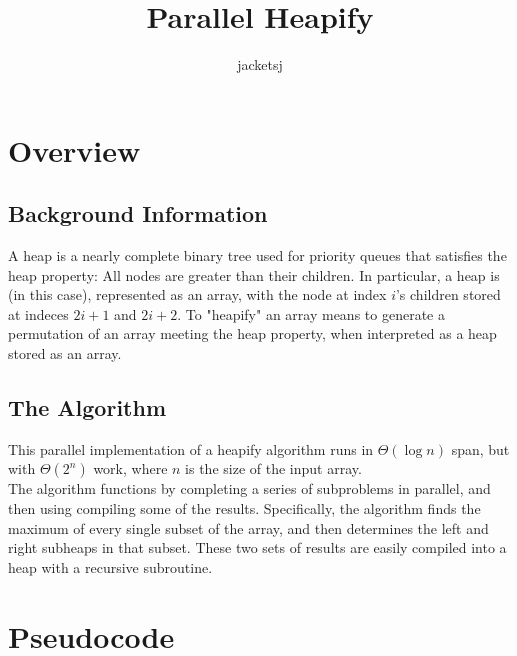 \documentclass[letterpaper, reqno, 11pt]{article}
\newcommand{\ttitle}{Parallel Heapify}
\newcommand{\tname}{jacketsj}
\begin{document}
\title{\ttitle}
\author{\tname}

\maketitle

\section*{Overview}
\subsection*{Background Information}
\indent A heap is a nearly complete binary tree used for priority queues that satisfies the heap property: All nodes are greater than their children.
In particular, a heap is (in this case), represented as an array, with the node at index $i$'s children stored at indeces $2i+1$ and $2i+2$.
To "heapify" an array means to generate a permutation of an array meeting the heap property, when interpreted as a heap stored as an array.\\
\subsection*{The Algorithm}
\indent This parallel implementation of a heapify algorithm runs in $\Theta(\log n)$ span, but with $\Theta(2^n)$ work, where $n$ is the size of the input array.\\
\indent The algorithm functions by completing a series of subproblems in parallel, and then using compiling some of the results.
Specifically, the algorithm finds the maximum of every single subset of the array, and then determines the left and right subheaps in that subset.
These two sets of results are easily compiled into a heap with a recursive subroutine.

\pagebreak
\section*{Pseudocode}
\end{document}
